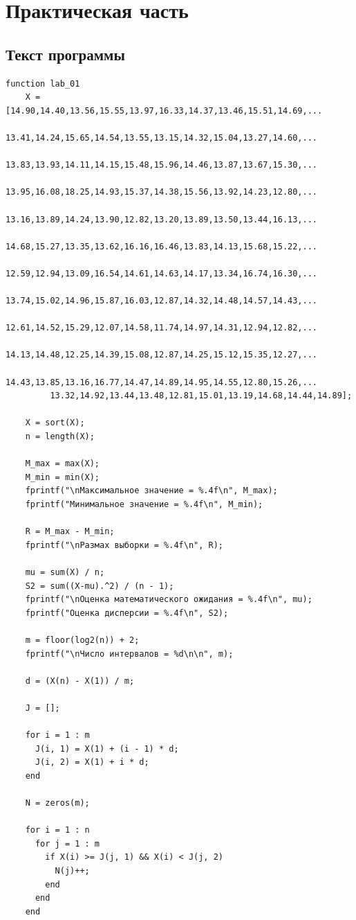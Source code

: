 \chapter{Практическая часть}

\section{Текст программы}

\begin{lstlisting}[style={Matlab}]
function lab_01
    X = [14.90,14.40,13.56,15.55,13.97,16.33,14.37,13.46,15.51,14.69,...
         13.41,14.24,15.65,14.54,13.55,13.15,14.32,15.04,13.27,14.60,...
         13.83,13.93,14.11,14.15,15.48,15.96,14.46,13.87,13.67,15.30,...
         13.95,16.08,18.25,14.93,15.37,14.38,15.56,13.92,14.23,12.80,...
         13.16,13.89,14.24,13.90,12.82,13.20,13.89,13.50,13.44,16.13,...
         14.68,15.27,13.35,13.62,16.16,16.46,13.83,14.13,15.68,15.22,...
         12.59,12.94,13.09,16.54,14.61,14.63,14.17,13.34,16.74,16.30,...
         13.74,15.02,14.96,15.87,16.03,12.87,14.32,14.48,14.57,14.43,...
         12.61,14.52,15.29,12.07,14.58,11.74,14.97,14.31,12.94,12.82,...
         14.13,14.48,12.25,14.39,15.08,12.87,14.25,15.12,15.35,12.27,...
         14.43,13.85,13.16,16.77,14.47,14.89,14.95,14.55,12.80,15.26,...
         13.32,14.92,13.44,13.48,12.81,15.01,13.19,14.68,14.44,14.89];

    X = sort(X);
    n = length(X);

    M_max = max(X);
    M_min = min(X);
    fprintf("\nМаксимальное значение = %.4f\n", M_max);
    fprintf("Минимальное значение = %.4f\n", M_min);

    R = M_max - M_min;
    fprintf("\nРазмах выборки = %.4f\n", R);

    mu = sum(X) / n;
    S2 = sum((X-mu).^2) / (n - 1);
    fprintf("\nОценка математического ожидания = %.4f\n", mu);
    fprintf("Оценка дисперсии = %.4f\n", S2);

    m = floor(log2(n)) + 2;
    fprintf("\nЧисло интервалов = %d\n\n", m);

    d = (X(n) - X(1)) / m;

    J = [];

    for i = 1 : m
      J(i, 1) = X(1) + (i - 1) * d;
      J(i, 2) = X(1) + i * d;
    end
 
    N = zeros(m);
    
    for i = 1 : n
      for j = 1 : m
        if X(i) >= J(j, 1) && X(i) < J(j, 2)
          N(j)++;
        end
      end
    end
    

\end{lstlisting}
